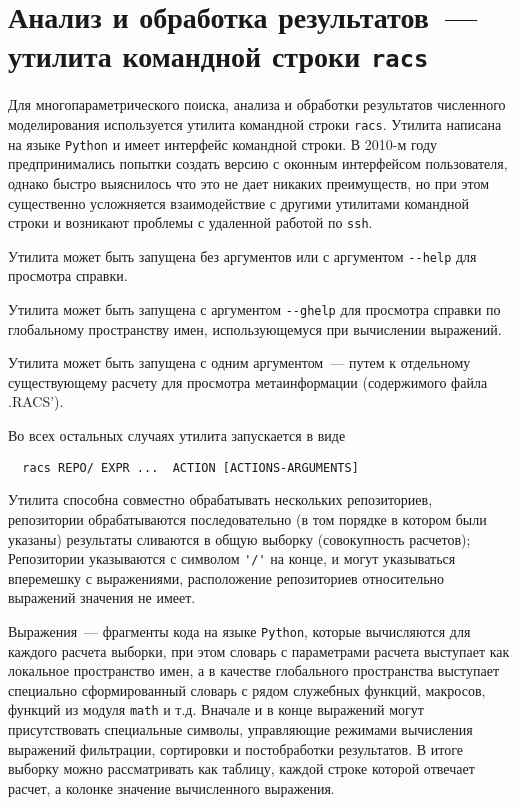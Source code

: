 \section{Анализ и обработка результатов~--- утилита командной строки {\tt racs}}
Для многопараметрического поиска, анализа и обработки результатов численного моделирования используется утилита командной строки \verb'racs'.
Утилита написана на языке \verb'Python' и имеет интерфейс командной строки. В 2010-м году предпринимались попытки создать
версию с оконным интерфейсом пользователя, однако быстро выяснилось что это не дает никаких преимуществ, но при этом
существенно усложняется взаимодействие с другими утилитами командной строки и возникают проблемы с удаленной работой по \verb'ssh'.

Утилита может быть запущена без аргументов или с аргументом \verb'--help' для просмотра справки.

Утилита может быть запущена с аргументом \verb'--ghelp' для просмотра справки по глобальному пространству имен, использующемуся при вычислении выражений.

Утилита может быть запущена с одним аргументом~--- путем к отдельному существующему расчету для
просмотра метаинформации (содержимого файла .RACS').

Во всех остальных случаях утилита запускается в виде
\begin{verbatim}
  racs REPO/ EXPR ...  ACTION [ACTIONS-ARGUMENTS]
\end{verbatim}

Утилита способна  совместно обрабатывать нескольких репозиториев,
репозитории обрабатываются последовательно (в том порядке в котором были указаны) результаты сливаются в общую выборку (совокупность расчетов);
Репозитории указываются с символом \verb|'/'| на конце, и могут указываться вперемешку с выражениями,
расположение репозиториев относительно выражений значения не имеет.

Выражения~--- фрагменты кода на языке \verb'Python', которые вычисляются для каждого расчета выборки, при этом словарь с параметрами
расчета выступает как локальное пространство имен,  а в качестве глобального пространства выступает специально сформированный словарь с рядом
служебных функций, макросов, функций из модуля \verb'math' и т.д. Вначале и в конце выражений могут присутствовать специальные символы,
управляющие режимами вычисления выражений фильтрации, сортировки и постобработки результатов. В итоге выборку можно рассматривать как таблицу,
каждой строке которой отвечает расчет, а колонке значение вычисленного выражения.

